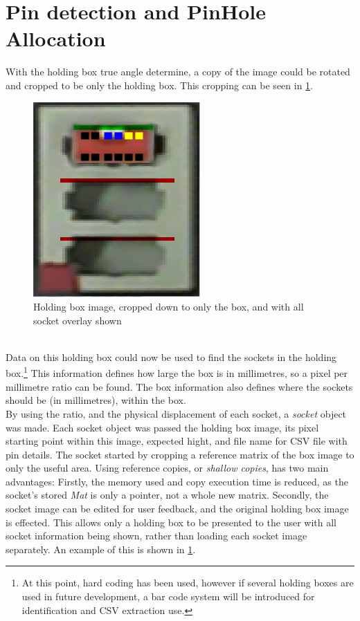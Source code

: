 \documentclass[11pt,a4paper]{report}
\begin{document}
\section{Pin detection and PinHole Allocation}
With the holding box true angle determine, a copy of the image could be rotated and cropped to be only the holding box. This cropping can be seen in \cref{fig:holdingblockwithdata}.
\begin{figure}[h]
	\centering
	\includegraphics[width=0.3\linewidth]{"holding_block_with_data"}
	\caption{Holding box image, cropped down to only the box, and with all socket overlay shown}
	\label{fig:holdingblockwithdata}
\end{figure}\\
Data on this holding box could now be used to find the sockets in the holding box.\footnote{At this point, hard coding has been used, however if several holding boxes are used in future development, a bar code system will be introduced for identification and CSV extraction use.} This information defines how large the box is in millimetres, so a pixel per millimetre ratio can be found. The box information also defines where the sockets should be (in millimetres), within the box.\\
By using the ratio, and the physical displacement of each socket, a \textit{socket} object was made. Each socket object was passed the holding box image, its pixel starting point within this image, expected hight, and file name for CSV file with pin details. The socket started by cropping a reference matrix of the box image to only the useful area. Using reference copies, or \textit{shallow copies}, has two main advantages: Firstly, the memory used  and copy execution time is reduced, as the socket's stored \textit{Mat} is only a pointer, not a whole new matrix. Secondly, the socket image can be edited for user feedback, and the original holding box image is effected. This allows only a holding box to be presented to the user with all socket information being shown, rather than loading each socket image separately. An example of this is shown in \cref{fig:holdingblockwithdata}. \\
\end{document}
